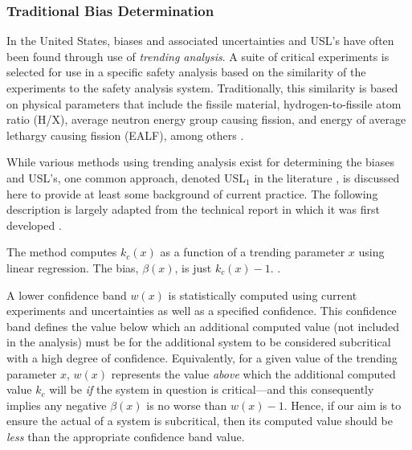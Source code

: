 
\subsubsection{Traditional Bias Determination}

In the United States, biases and associated uncertainties and USL's have 
often been found through use of \textit{ trending analysis}.  A suite of 
critical experiments is selected for use in a specific safety analysis 
based on the similarity of the experiments to the safety analysis system.  
Traditionally, this similarity is based on physical parameters that include 
the fissile material, hydrogen-to-fissile atom ratio (H/X), average neutron 
energy group causing fission, and energy of average lethargy causing 
fission (EALF), among others \cite{broadhead2004sau}.

While various methods using trending analysis exist for determining the 
biases and USL's, one common approach, denoted USL$_1$ in the 
literature \cite{broadhead2004sau}, is discussed here to provide at least 
some background of current practice. The following description is largely 
adapted from the technical report in which it was first developed 
\cite{lichtenwalter1997cbg}. 

The method computes $k_c(x)$ as a function of a trending parameter $x$ 
using linear regression.  The bias, $\beta(x)$, is just $k_c(x) - 1$.  .  

A lower confidence band $w(x)$ is statistically computed using current 
experiments and uncertainties as well as a specified confidence.  This 
confidence band defines the value below which an additional computed 
\keff value (\ie not included in the analysis) must be for the additional 
system to be considered subcritical with a high degree of confidence.  
Equivalently, for a given value of the trending parameter $x$, $w(x)$ 
represents the value \textit{ above} which the additional computed value $k_c$ 
will be \textit{ if} the system in question is critical---and this consequently 
implies any negative $\beta(x)$ is no worse than $w(x) - 1$.  Hence, if our 
aim is to ensure the actual \keff of a system is subcritical, then its 
computed value should be \textit{ less} than the appropriate confidence band 
value.

